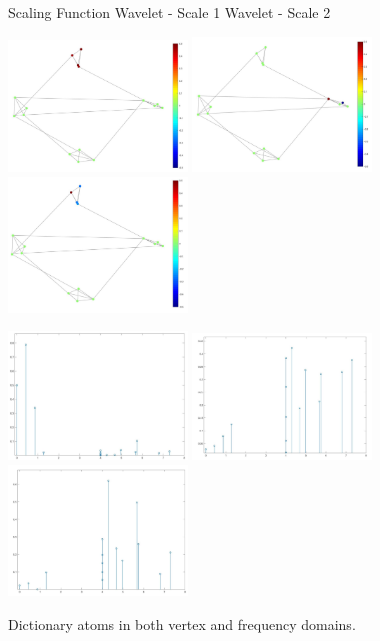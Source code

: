 \documentclass[a4paper]{article}
\begin{document}
\begin{figure}[H]
\centering

Scaling Function \qquad\qquad\qquad\qquad Wavelet - Scale 1 \qquad\qquad\qquad Wavelet - Scale 2

\includegraphics[width=4.75cm,keepaspectratio]{scaling_vertex} \includegraphics[width=4.75cm,keepaspectratio]{wavelet_scale_1_vertex} \includegraphics[width=4.75cm,keepaspectratio]{wavelet_scale_2_vertex}

\includegraphics[width=4.75cm,keepaspectratio]{scaling_frequency} \includegraphics[width=4.75cm,keepaspectratio]{wavelet_scale_1_frequency} \includegraphics[width=4.75cm,keepaspectratio]{wavelet_scale_2_frequency}

\caption{\label{fig:community dictionary atoms} Dictionary atoms in both vertex and frequency domains.}
\end{figure}
\end{document}
